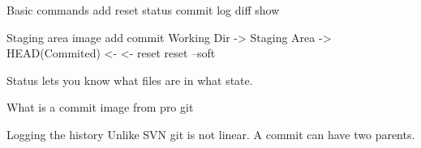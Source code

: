 \documentclass[14pt]{beamer}
\begin{document}
\begin{frame}{Basic commands}
	add
	reset
	status
	commit
	log
	diff
	show
\end{frame}

\begin{frame}{Staging area}
	image
           add            commit
Working Dir -> Staging Area -> HEAD(Commited)
            <-              <-
          reset        reset --soft

Status lets you know what files are in what state.
\end{frame}

\begin{frame}{What is a commit}
	image from pro git
\end{frame}

\begin{frame}{Logging the history}
	Unlike SVN git is not linear.  A commit can have two parents.
\end{frame}
\end{document}
